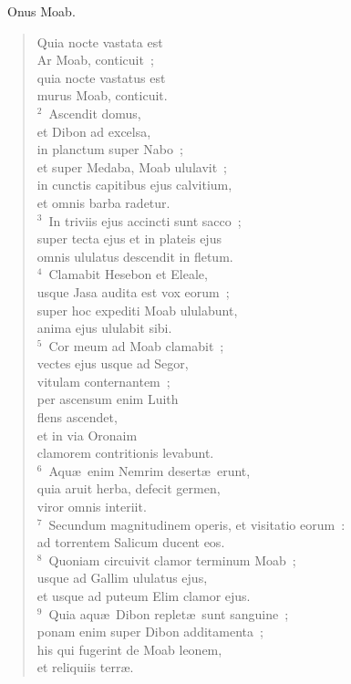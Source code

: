 ~\lettrine[lines=10,image=true,loversize=0.05,lraise=-0.03]{O}{}nus Moab. \begin{flushleft}\begin{verse}\vspace{6pt}Quia nocte vastata est\\ Ar Moab, conticuit~;\\ quia nocte vastatus est\\ murus Moab, conticuit.\\
${}^{2}$~Ascendit domus,\\ et Dibon ad excelsa,\\ in planctum super Nabo~;\\ et super Medaba, Moab ululavit~;\\ in cunctis capitibus ejus calvitium,\\ et omnis barba radetur.\\
${}^{3}$~In triviis ejus accincti sunt sacco~;\\ super tecta ejus et in plateis ejus\\ omnis ululatus descendit in fletum.\\
${}^{4}$~Clamabit Hesebon et Eleale,\\ usque Jasa audita est vox eorum~;\\ super hoc expediti Moab ululabunt,\\ anima ejus ululabit sibi.\\
${}^{5}$~Cor meum ad Moab clamabit~;\\ vectes ejus usque ad Segor,\\ vitulam conternantem~;\\ per ascensum enim Luith\\ flens ascendet,\\ et in via Oronaim\\ clamorem contritionis levabunt.\\
${}^{6}$~Aqu\ae\ enim Nemrim desert\ae\ erunt,\\ quia aruit herba, defecit germen,\\ viror omnis interiit.\\
${}^{7}$~Secundum magnitudinem operis, et visitatio eorum~:\\ ad torrentem Salicum ducent eos.\\
${}^{8}$~Quoniam circuivit clamor terminum Moab~;\\ usque ad Gallim ululatus ejus,\\ et usque ad puteum Elim clamor ejus.\\
${}^{9}$~Quia aqu\ae\ Dibon replet\ae\ sunt sanguine~;\\ ponam enim super Dibon additamenta~;\\ his qui fugerint de Moab leonem,\\ et reliquiis terr\ae .\end{verse}\end{flushleft}


